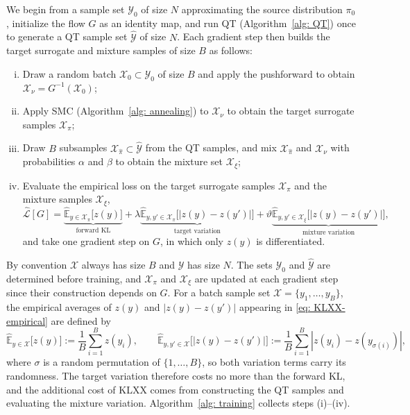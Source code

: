 \documentclass{article}
\begin{document}
We begin from a sample set $\mathcal Y_0$ of size $N$ approximating the source distribution $\pi_0$, initialize the flow $G$ as an identity map, and run QT (Algorithm~\ref{alg: QT}) once to generate a QT sample set $\hat{\mathcal Y}$ of size $N$. Each gradient step then builds the target surrogate and mixture samples of size $B$ as follows:
\begin{enumerate}[(i)]
	\setlength{\itemsep}{0pt}
	\item Draw a random batch $\mathcal X_0\subset \mathcal Y_0$ of size $B$ and apply the pushforward to obtain $\mathcal X_{\nu} = G^{-1}(\mathcal X_0)$;
	\item Apply SMC (Algorithm~\ref{alg: annealing}) to $\mathcal X_\nu$ to obtain the target surrogate samples $\mathcal X_{\pi}$;
	\item Draw $B$ subsamples $\mathcal X_{\hat\pi}\subset \hat{\mathcal Y}$ from the QT samples, and mix $\mathcal X_{\hat\pi}$ and $\mathcal X_{\nu}$ with probabilities $\alpha$ and $\beta$ to obtain the mixture set $\mathcal X_{\xi}$;
	\item Evaluate the empirical loss on the target surrogate samples $\mathcal X_{\pi}$ and the mixture samples $\mathcal X_{\xi}$,
	\begin{equation}
	\widehat{\mathcal L}[G]=\underbrace{\widehat{\mathbb E}_{y\in\mathcal X_\pi}\bigl[z(y)\bigr]}_{\text{forward KL}} +
	\lambda\underbrace{\widehat{\mathbb E}_{y,y'\in\mathcal X_\pi}\bigl[|z(y)-z(y')|\bigr]}_{\text{target variation}}
	+\vartheta\underbrace{\widehat{\mathbb E}_{y,y'\in\mathcal X_{\xi}}\bigl[|z(y)-z(y')|\bigr]}_{\text{mixture variation}},
	\label{eq: KLXX-empirical}
	\end{equation}
	and take one gradient step on $G$, in which only $z(y) $ is differentiated.
\end{enumerate}
By convention $\mathcal X$ always has size $B$ and $\mathcal Y$ has size $N$. The sets $\mathcal Y_0$ and $\hat{\mathcal Y}$ are determined before training, and $\mathcal X_{\pi}$ and $\mathcal X_{\xi}$ are updated at each gradient step since their construction depends on $G$.
For a batch sample set $\mathcal X = \{y_1,\dots,y_B\}$, the empirical averages of $z(y)$ and $|z(y)-z(y')|$ appearing in \eqref{eq: KLXX-empirical} are defined by
\begin{equation}
	\widehat{\mathbb E}_{y\in \mathcal X} \big[z(y)\big] := \frac1B \sum_{i=1}^B z(y_i), \qquad \widehat{\mathbb E}_{y,y'\in \mathcal X} \big[|z(y)-z(y')|\big] := \frac1B\sum_{i=1}^B |z(y_i) - z(y_{\sigma(i)})|,
	\label{eq: empirical-variation}
\end{equation}
where $\sigma$ is a random permutation of $\{1,\dots,B\}$, so both variation terms carry its randomness. The target variation therefore costs no more than the forward KL, and the additional cost of KLXX comes from constructing the QT samples and evaluating the mixture variation. Algorithm~\ref{alg: training} collects steps (i)--(iv).
\end{document}
